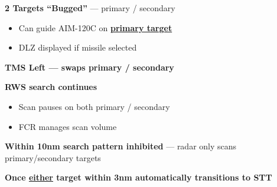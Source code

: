 \begin{tcoloritemize}
{    \begin{subitemize}
        \item \textbf{2 Targets ``Bugged''} --- primary / secondary
        \begin{itemize}
            \item Can guide AIM-120C on \textbf{\underline{primary target}}
            \item DLZ displayed if missile selected
        \end{itemize}
        \item \textbf{TMS Left --- swaps primary / secondary}
        \item \textbf{RWS search  continues}
        \begin{itemize}
            \item Scan pauses on both primary / secondary
            \item FCR manages scan volume
        \end{itemize}
        \item \textbf{Within 10nm search pattern inhibited} --- radar only scans primary/secondary targets
        \item \textbf{Once \underline{either} target within 3nm automatically transitions to STT}
    \end{subitemize}}
\end{tcoloritemize}

